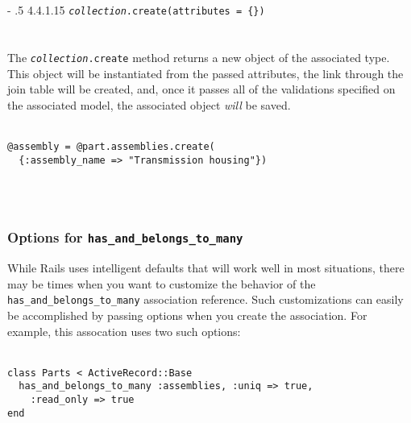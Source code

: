 \documentclass[10pt]{book}
\makeatletter
\renewcommand\paragraph{%
   \@startsection{paragraph}{4}{0mm}%
      {-\baselineskip}%
      {.5\baselineskip}%
      {\normalfont\scriptsize\bfseries}}
\makeatother
\begin{document}
\paragraph{4.4.1.15 \texttt{\emph{collection}.create(attributes = \{\})}}\\ \\\\

The \texttt{\emph{collection}.create} method returns a new object  of the associated type. This object will be instantiated from the passed  attributes, the link through the join table will be created, and, once  it passes all of the validations specified on the associated model, the  associated object \emph{will} be saved.
\\ \\
\begin{minipage}{\textwidth}{\scriptsize
\begin{verbatim}
@assembly = @part.assemblies.create(
  {:assembly_name => "Transmission housing"})
\end{verbatim}}
\end{minipage}
\\ \\

\subsubsection{ Options for \texttt{has\_and\_belongs\_to\_many}}

While Rails uses intelligent defaults that will work well in most  situations, there may be times when you want to customize the behavior  of the \texttt{has\_and\_belongs\_to\_many} association reference. Such  customizations can easily be accomplished by passing options when you  create the association. For example, this assocation uses two such  options:
\\ \\
\begin{minipage}{\textwidth}{\scriptsize
\begin{verbatim}
class Parts < ActiveRecord::Base
  has_and_belongs_to_many :assemblies, :uniq => true,
    :read_only => true
end
\end{verbatim}}
\end{minipage}
\\ \\
\end{document}
